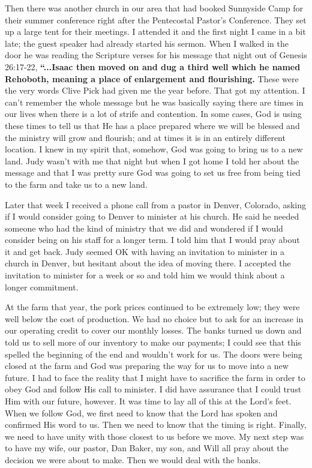 \documentclass[twoside, 12pt]{book}
\begin{document}
Then there was another church in our area that had booked Sunnyside Camp for their summer conference right after the Pentecostal Pastor’s Conference. They set up a large tent for their meetings. I attended it and the first night I came in a bit late; the guest speaker had already started his sermon. When I walked in the door he was reading the Scripture verses for his message that night out of Genesis 26:17-22, \textbf{``...Isaac then moved on and dug a third well which he named Rehoboth, meaning a place of enlargement and flourishing.} These were the very words Clive Pick had given me the year before. That got my attention. I can’t remember the whole message but he was basically saying there are times in our lives when there is a lot of strife and contention. In some cases, God is using these times to tell us that He has a place prepared where we will be blessed and the ministry will grow and flourish; and at times it is in an entirely different location. I knew in my spirit that, somehow, God was going to bring us to a new land. Judy wasn’t with me that night but when I got home I told her about the message and that I was pretty sure God was going to set us free from being tied to the farm and take us to a new land. 

Later that week I received a phone call from a pastor in Denver, Colorado, asking if I would consider going to Denver to minister at his church. He said he needed someone who had the kind of ministry that we did and wondered if I would consider being on his staff for a longer term. I told him that I would  pray about it and get back. Judy seemed OK with having an invitation to minister in a church in Denver, but hesitant about the idea of moving there. I accepted the invitation to minister for a week or so and told him we would think about a longer commitment.

At the farm that year, the pork prices continued to be extremely low; they were well below the cost of production. We had no choice but to ask for an increase in our operating credit to cover our monthly losses. The banks turned us down and told us to sell more of our inventory to make our payments; I could see that this spelled the beginning of the end and wouldn’t work for us. The doors were being closed at the farm and God was preparing the way for us to move into a new future. I had to face the reality that I might have to sacrifice the farm in order to obey God and follow His call to minister. I did have assurance that I could trust Him with our future, however. It was time to lay all of this at the Lord’s feet. When we follow God, we first need to know that the Lord has spoken and confirmed His word to us. Then we need to know that the timing is right. Finally, we need to have unity with those closest to us before we move.  My next step was to have my wife, our pastor, Dan Baker, my son, and Will all pray about the decision we were about to make. Then we would deal with the banks.
\end{document}
